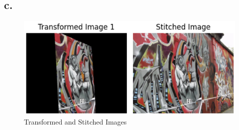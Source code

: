 \documentclass[12pt,a4paper]{article}
\begin{document}

\subsection{c.}


    \begin{figure}[H]
        \centering
        \includegraphics[width=0.85\linewidth]{images/Screenshots/4_32.png}
        \caption{Transformed and Stitched Images}
        \label{fig:enter-label}
    \end{figure}
\end{document}
